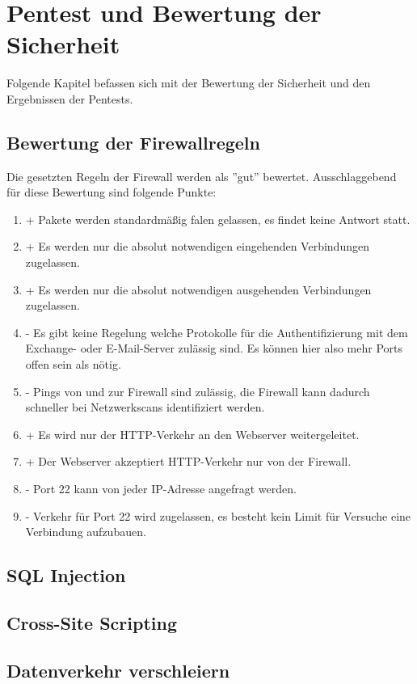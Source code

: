 \documentclass[
    a4paper,
    pagesize,
	pdftex,
    12pt,
]{scrartcl}
\begin{document}
\newpage
\section{Pentest und Bewertung der Sicherheit}
Folgende Kapitel befassen sich mit der Bewertung der Sicherheit und den Ergebnissen der Pentests.

\subsection{Bewertung der Firewallregeln}
Die gesetzten Regeln der Firewall werden als ''gut'' bewertet. Ausschlaggebend für diese Bewertung sind folgende Punkte:
\begin{enumerate}
	\item + Pakete werden standardmäßig falen gelassen, es findet keine Antwort statt.
	\item + Es werden nur die absolut notwendigen eingehenden Verbindungen zugelassen.
	\item + Es werden nur die absolut notwendigen ausgehenden Verbindungen zugelassen.
	\item - Es gibt keine Regelung welche Protokolle für die Authentifizierung mit dem Exchange- oder E-Mail-Server zulässig sind. Es können hier also mehr Ports offen sein als nötig.
	\item - Pings von und zur Firewall sind zulässig, die Firewall kann dadurch schneller bei Netzwerkscans identifiziert werden.
	\item + Es wird nur der HTTP-Verkehr an den Webserver weitergeleitet.
	\item + Der Webserver akzeptiert HTTP-Verkehr nur von der Firewall.
	\item - Port 22 kann von jeder IP-Adresse angefragt werden.
	\item - Verkehr für Port 22 wird zugelassen, es besteht kein Limit für Versuche eine Verbindung aufzubauen.
\end{enumerate}

\subsection{SQL Injection}

\subsection{Cross-Site Scripting}

\subsection{Datenverkehr verschleiern}
\end{document}
